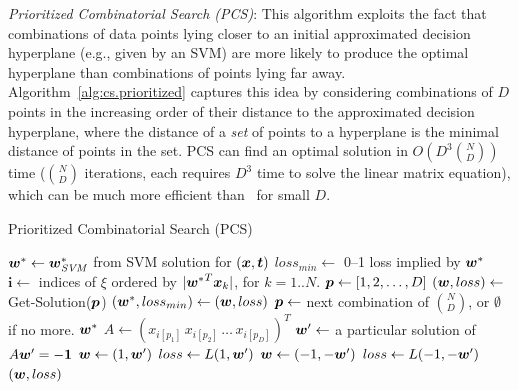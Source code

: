 \noindent\emph{Prioritized Combinatorial Search (PCS)}: This algorithm
exploits the fact that combinations of data points lying closer to an
initial approximated decision hyperplane (e.g., given by an SVM) are
more likely to produce the optimal hyperplane than combinations of
points lying far away. Algorithm~\ref{alg:cs.prioritized} captures this idea by considering
combinations of $D$ points in the increasing order of their distance
to the approximated decision hyperplane, where the distance of a \emph{set}
of points to a hyperplane is the minimal distance of points in the set.  PCS
can find an optimal solution in $O(D^3 \binom{N}{D})$ 
time ($\binom{N}{D}$ iterations, each requires $D^3$ time to solve the linear matrix equation),
which can be much more efficient than \BB\ for small $D$.

\begin{algorithm}[t!]
\caption{Prioritized Combinatorial Search (PCS)}
\label{alg:cs.prioritized}
{\footnotesize 
\begin{algorithmic}%
\STATE $\boldsymbol{w}^* \gets \boldsymbol{w}^*_{\mathit{SVM}}$ from SVM solution for $(\boldsymbol{x},\boldsymbol{t})$
\STATE $loss_{min} \gets$ 0--1 loss implied by $\boldsymbol{w}^*$
\STATE $\boldsymbol{i} \gets$ indices of $\xi$ ordered by $|{\boldsymbol{w}^*}^T\boldsymbol{x}_k|$, for $k=1..N$.
\STATE $\boldsymbol{p} \gets [1,2,\dots,D]$
\WHILE{$\p \not= \emptyset$}
   \STATE $(\boldsymbol{w},loss) \gets$ {\sc Get-Solution}($\boldsymbol{p}$)
      \STATE $(\boldsymbol{w}^*, loss_{min}) \gets (\boldsymbol{w}, loss)$
   \ENDIF
   \STATE $\boldsymbol{p} \gets $ next combination of ${N \choose D}$, or $\emptyset$ if no more.
\ENDWHILE
{} $\boldsymbol{w}^*$
\STATE
{}
   \STATE $A \gets (x_{i[p_1]} \, x_{i[p_2]} \, \dots \, x_{i[p_D]})^T$
   \STATE $\boldsymbol{w}' \gets$ a particular solution of $A \boldsymbol{w}' = -\boldsymbol{1}$
      \STATE $\boldsymbol{w} \gets (1, \boldsymbol{w}')$
      \STATE $loss \gets L(1,\boldsymbol{w}')$
   \ELSE
      \STATE $\boldsymbol{w} \gets (-1, -\boldsymbol{w}')$
      \STATE $loss \gets L(-1,-\boldsymbol{w}')$
   \ENDIF
    $(\boldsymbol{w}, loss)$ 
\ENDFUNCTION
\ENDFUNCTION
\end{algorithmic}}
\end{algorithm}

